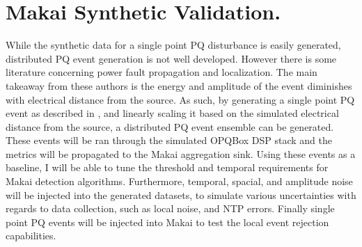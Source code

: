 \section{Makai Synthetic Validation.}
While the synthetic data for a single point PQ disturbance is easily generated, distributed PQ event generation is not well developed. However there is some literature concerning power fault propagation and localization. \cite{parsons1998direction} \cite{polajvzer2017evaluation} The main takeaway from these authors is the energy and amplitude of the event diminishes with electrical distance from the source. As such, by generating a single point PQ event as described in \cite{kumar2015power}\cite{tan2013simulation}, and linearly scaling it based on the simulated electrical distance from the source, a distributed PQ event ensemble can be generated. These events will be ran through the simulated OPQBox DSP stack and the metrics will be propagated to the Makai aggregation sink. Using these events as a baseline, I will be able to tune the threshold and temporal requirements for Makai detection algorithms. Furthermore, temporal, spacial, and amplitude noise will be injected into the generated datasets, to simulate various uncertainties with regards to data collection, such as local noise, and NTP errors. Finally single point PQ events will be injected into Makai to test the local event rejection capabilities.

